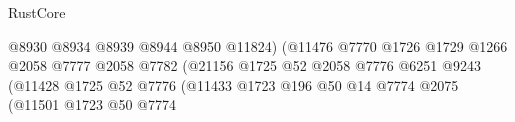 \begin{lexlean}{RustCore}
\begin{coremodule}
                                                              @8930
                                                              @8934
                                                              @8939
                                                              @8944
                                                              @8950
                                                              @11824)
                                                            (@11476
                                                              @7770
                                                              @1726
                                                              @1729
                                                              @1266
                                                              @2058
                                                              @7777
                                                              @2058
                                                              @7782
                                                              (@21156
                                                                @1725
                                                                @52
                                                                @2058
                                                                @7776
                                                                @6251
                                                                @9243
                                                                (@11428
                                                                  @1725
                                                                  @52
                                                                  @7776
                                                                  (@11433
                                                                    @1723
                                                                    @196
                                                                    @50
                                                                    @14
                                                                    @7774
                                                                    @2075
                                                                    (@11501
                                                                      @1723
                                                                      @50
                                                                      @7774

\end{coremodule}
\end{lexlean}
